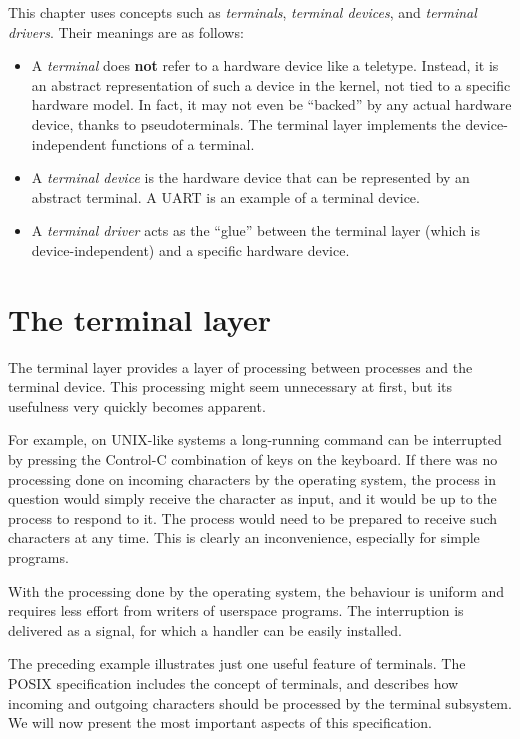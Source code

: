 \documentclass[shortabstract, manyadvisors, english, mgr]{iithesis}
\begin{document}
This chapter uses concepts such as \textit{terminals}, \textit{terminal
  devices}, and \textit{terminal drivers}. Their meanings are as follows:
\begin{itemize}
\item A \textit{terminal} does \textbf{not} refer to a hardware device like a
  teletype. Instead, it is an abstract representation of such a device in the
  kernel, not tied to a specific hardware model. In fact, it may not even be
  ``backed'' by any actual hardware device, thanks to pseudoterminals. The
  terminal layer implements the device-independent functions of a terminal.
\item A \textit{terminal device} is the hardware device that can be represented
  by an abstract terminal. A UART is an example of a terminal device.
\item A \textit{terminal driver} acts as the ``glue'' between the terminal layer
  (which is device-independent) and a specific hardware device.
\end{itemize}

\section{The terminal layer}

The terminal layer provides a layer of processing between processes and the
terminal device. This processing might seem unnecessary at first, but its
usefulness very quickly becomes apparent.

For example, on UNIX-like systems a long-running command can be interrupted by
pressing the Control-C combination of keys on the keyboard. If there was no
processing done on incoming characters by the operating system, the process in
question would simply receive the character as input, and it would be up to the
process to respond to it. The process would need to be prepared to receive such
characters at any time. This is clearly an inconvenience, especially for simple
programs.

With the processing done by the operating system, the behaviour is uniform and
requires less effort from writers of userspace programs. The interruption is
delivered as a signal, for which a handler can be easily installed.

The preceding example illustrates just one useful feature of terminals. 
The POSIX specification includes the concept of terminals, and describes how
incoming and outgoing characters should be processed by the terminal subsystem. 
We will now present the most important aspects of this specification.
\end{document}
